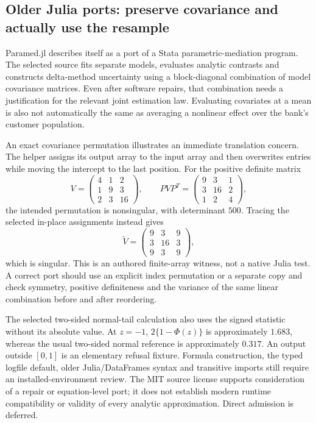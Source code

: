 \subsection{Older Julia ports: preserve covariance and actually use the resample}

Paramed.jl describes itself as a port of a Stata parametric-mediation program.
The selected source fits separate models, evaluates analytic contrasts and
constructs delta-method uncertainty using a block-diagonal combination of
model covariance matrices. Even after software repairs, that combination needs
a justification for the relevant joint estimation law. Evaluating covariates
at a mean is also not automatically the same as averaging a nonlinear effect
over the bank's customer population.~\citep{exec25_omed_paramed}

An exact covariance permutation illustrates an immediate translation concern.
The helper assigns its output array to the input array and then overwrites
entries while moving the intercept to the last position. For the positive
definite matrix
\[
 V=\begin{pmatrix}4&1&2\\1&9&3\\2&3&16\end{pmatrix},\qquad
 PVP^T=\begin{pmatrix}9&3&1\\3&16&2\\1&2&4\end{pmatrix},
\]
the intended permutation is nonsingular, with determinant $500$. Tracing the
selected in-place assignments instead gives
\[
 \widetilde V=\begin{pmatrix}9&3&9\\3&16&3\\9&3&9\end{pmatrix},
\]
which is singular. This is an authored finite-array witness, not a native Julia
test. A correct port should use an explicit index permutation or a separate
copy and check symmetry, positive definiteness and the variance of the same
linear combination before and after reordering.~\citep{exec25_omed_paramed,exec25_omed_choice}

The selected two-sided normal-tail calculation also uses the signed statistic
without its absolute value. At $z=-1$, $2\{1-\Phi(z)\}$ is approximately
$1.683$, whereas the usual two-sided normal reference is approximately $0.317$.
An output outside $[0,1]$ is an elementary refusal fixture. Formula construction,
the typed logfile default, older Julia/DataFrames syntax and transitive imports
still require an installed-environment review. The MIT source license supports
consideration of a repair or equation-level port; it does not establish modern
runtime compatibility or validity of every analytic approximation. Direct
admission is deferred.~\citep{exec25_omed_paramed,exec25_omed_choice}

